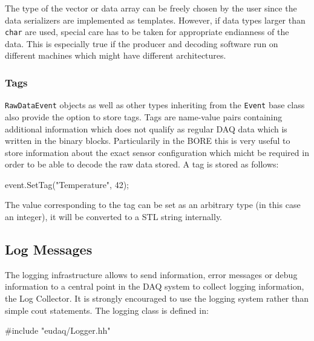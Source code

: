 The type of the vector or data array can be freely chosen by the user since the data serializers are implemented as templates.
However, if data types larger than \texttt{char} are used, special care has to be taken for appropriate endianness of the data.
This is especially true if the producer and decoding software run on different machines which might have different architectures.


\subsubsection{Tags}\label{sec:Tags}
\texttt{RawDataEvent} objects as well as other types inheriting from the \texttt{Event} base class also provide the option to store tags.
Tags are name-value pairs containing additional information which does not qualify as regular DAQ data which is written in the binary blocks.
Particularily in the \gls{BORE} this is very useful to store information about the exact sensor configuration which micht be required in order to be able to decode the raw data stored.
A tag is stored as follows:
\begin{listing}
event.SetTag("Temperature", 42);
\end{listing}

The value corresponding to the tag can be set as an arbitrary type (in this case an integer),
it will be converted to a STL string internally.

\subsection{Log Messages}
The logging infrastructure allows to send information, error messages or debug information to a central point in the DAQ system to collect logging information, the Log Collector.
It is strongly encouraged to use the logging system rather than simple cout statements.
The logging class is defined in:
\begin{listing}
#include "eudaq/Logger.hh"
\end{listing}

